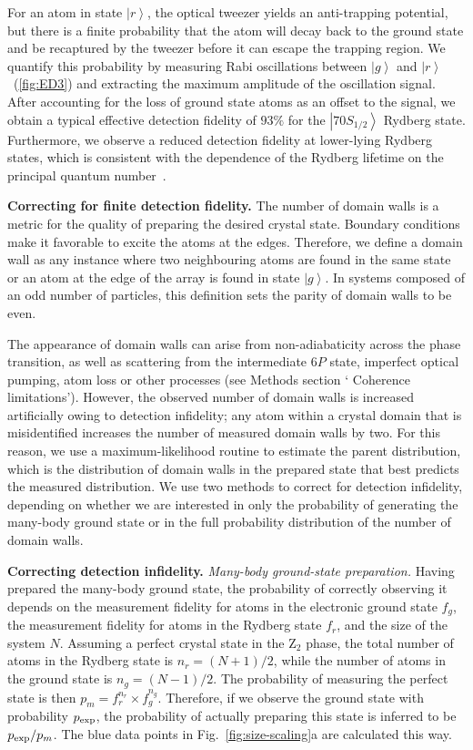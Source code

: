 \documentclass[prl,nobalancelastpage,twocolumn,superscriptaddress,nofootinbib]{revtex4}
\newcommand{\ket}[1]{\left|#1\right\rangle}
\begin{document}
\begin{footnotesize}
For an atom in state $\ket{r}$, the optical tweezer yields an anti-trapping
potential, but there is a finite probability that the atom will decay back to
the ground state and be recaptured by the tweezer before it can escape the
trapping region. We quantify this probability by measuring Rabi oscillations
between $\ket{g}$ and $\ket{r}$~(\ref{fig:ED3}) and extracting the maximum
amplitude of the oscillation signal. After accounting for the loss of ground
state atoms as an offset to the signal, we obtain a typical effective detection
fidelity of $93\%$ for the $\ket{70S_{1/2}}$ Rydberg state. Furthermore, we
observe a reduced detection fidelity at lower-lying Rydberg states, which is
consistent with the dependence of the Rydberg lifetime on the principal quantum
number~\cite{Beterov2009}.

\noindent
\textbf{Correcting for finite detection fidelity.}
The number of domain walls is a metric for the quality of preparing the desired
crystal state. Boundary conditions make it favorable to excite the atoms at the
edges. Therefore, we define a domain wall as any instance where two
neighbouring atoms are found in the same state or an atom at the edge of the
array is found in state $\ket{g}$. In systems composed of an odd number of
particles, this definition sets the parity of domain walls to be even.

The appearance of domain walls can arise from non-adiabaticity across the phase
transition, as well as scattering from the intermediate $6P$ state, imperfect
optical pumping, atom loss or other processes (see Methods section ` Coherence
limitations'). However, the observed number of domain walls is increased artificially
owing to detection infidelity; any atom within a crystal domain that
is misidentified increases the number of measured domain walls by two. For this
reason, we use a maximum-likelihood routine to estimate the parent
distribution, which is the distribution of domain walls in the prepared state
that best predicts the measured distribution. We use two methods to correct for
detection infidelity, depending on whether we are interested in only the
probability of generating the many-body ground state or in the full probability
distribution of the number of domain walls.

\noindent
\textbf{Correcting detection infidelity.} \emph{Many-body ground-state
preparation.} Having prepared the many-body ground state, the probability of
correctly observing it depends on the measurement fidelity for atoms in the
electronic ground state $f_g$, the measurement fidelity for atoms in the
Rydberg state $f_{r}$, and the size of the system $N$. Assuming a perfect
crystal state in the Z$_{2}$ phase, the total number of atoms in the Rydberg
state is $n_{r} = (N+1)/2$, while the number of atoms in the ground state is
$n_{g} = (N-1)/2$.  The probability of measuring the perfect state is then $p_m
= f_{r}^{n_{r}}\times f_{g}^{n_{g}}$. Therefore, if we observe the ground state
with probability $p_{\rm exp}$, the probability of actually preparing this
state is inferred to be $p_{\rm exp}/p_{m}$. The blue data points in Fig.~\ref{fig:size-scaling}a
are calculated this way.


\end{footnotesize}
\end{document}
